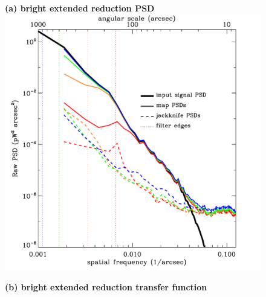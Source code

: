 \documentclass[useAMS,usenatbib,nofootinbib]{mn2e}
\begin{document}
\begin{figure}
\centering
\begin{minipage}[h]{0.495\linewidth}
\textbf{(a) bright extended reduction PSD} \\

\includegraphics[width=\linewidth]{pspec_m17_bright_extended}
\end{minipage}
\begin{minipage}[h]{0.495\linewidth}
\textbf{(b) bright extended reduction transfer function} \\


\end{minipage}
\end{figure}
\end{document}
